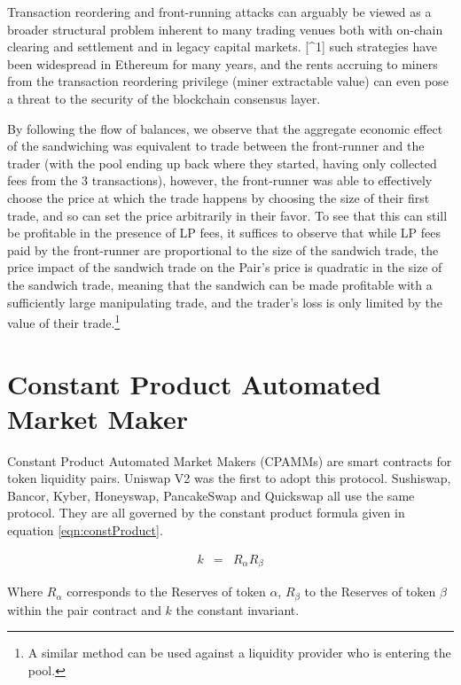 \documentclass[runningheads]{llncs}
\begin{document}
Transaction reordering and front-running attacks can arguably be viewed as a broader structural problem inherent to many trading venues both with on-chain clearing and settlement and in legacy capital markets. [^1] such strategies have been widespread in Ethereum for many years, and the rents accruing to miners from the transaction reordering privilege (miner extractable value) can even pose a threat to the security of the blockchain consensus layer.

By following the flow of balances, we observe that the aggregate economic effect of the sandwiching was equivalent to trade between the front-runner and the trader (with the pool ending up back where they started, having only collected fees from the 3 transactions), however, the front-runner was able to effectively choose the price at which the trade happens by choosing the size of their first trade, and so can set the price arbitrarily in their favor. To see that this can still be profitable in the presence of LP fees, it suffices to observe that while LP fees paid by the front-runner are proportional to the size of the sandwich trade, the price impact of the sandwich trade on the Pair's price is quadratic in the size of the sandwich trade, meaning that the sandwich can be made profitable with a sufficiently large manipulating trade, and the trader's loss is only limited by the value of their trade.\footnote{A similar method can be used against a liquidity provider who is entering the pool.}


\section{Constant Product Automated Market Maker}
Constant Product Automated Market Makers (CPAMMs) are smart contracts for token liquidity pairs. Uniswap V2 was the first to adopt this protocol. Sushiswap, Bancor, Kyber, Honeyswap, PancakeSwap and Quickswap all use the same protocol. They are all governed by the constant product formula given in equation \ref{eqn:constProduct}.

\begin{eqnarray}
	k  &=& R_{\alpha}  R_{\beta}  \label{eqn:constProduct}
\end{eqnarray}

Where \(R_{\alpha}\) corresponds to the Reserves of token \(\alpha\), \(R_{\beta}\) to the Reserves of token \(\beta\) within the pair contract and \( k \) the constant invariant.
\end{document}
